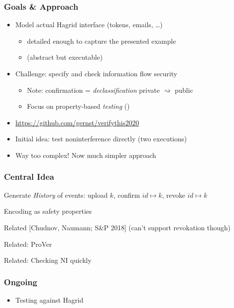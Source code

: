 \documentclass[12pt,english,dvipsnames]{beamer}
\newcommand{\red}[1]{{\color{red}#1}}
\newcommand{\green}[1]{{\color{cpacheckergreen}#1}}
\newcommand{\Yes}{\green{\cmark}}
\newcommand{\No}{\red{\xmark}}
\newcommand{\code}[1]{\text{\upshape\ttfamily#1}}
\newcommand{\id}{\mathit{id}}
\begin{document}
\begin{frame}
    \frametitle{Goals \& Approach}
    \begin{itemize}
    \item Model actual Hagrid interface (tokens, emails, \ldots) \\
        \begin{itemize}
        \item detailed enough to capture the presented example
        \item \code{Scala} (abstract but executable)
        \end{itemize}
    \item Challenge: specify and check information flow security
        \begin{itemize}
        \item Note: confirmation = \emph{declassification} private $\rightsquigarrow$ public
        \item Focus on property-based \emph{testing} (\code{ScalaCheck})
        \end{itemize}
    \item \url{https://github.com/gernst/verifythis2020}
    \end{itemize}

\medskip\pause

    \begin{itemize}
    \item[\No] Initial idea: test noninterference directly (two executions)
    \item[\Yes] Way too complex! Now much simpler approach
    \end{itemize}
\end{frame}

\begin{frame}
    \frametitle{Central Idea}
    Generate \emph{History} of events:
    upload $k$, confirm $\id \mapsto k$, revoke $\id \mapsto k$

    Encoding as safety properties

    Related [Chudnov, Naumann; S\&P 2018] (can't support revokation though)

    Related: ProVer

    Related: Checking NI quickly
\end{frame}

\begin{frame}
    \frametitle{Ongoing}
    \begin{itemize}
    \item Testing against Hagrid
    \end{itemize}
\end{frame}
\end{document}
